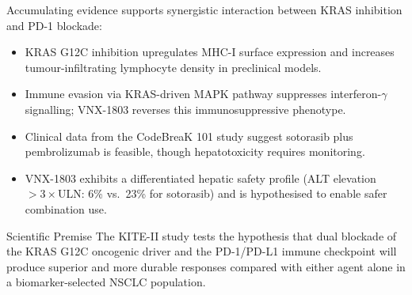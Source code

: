 Accumulating evidence supports synergistic interaction between KRAS inhibition and PD-1 blockade:

\begin{itemize}
  \item KRAS G12C inhibition upregulates MHC-I surface expression and increases tumour-infiltrating lymphocyte density in preclinical models.
  \item Immune evasion via KRAS-driven MAPK pathway suppresses interferon-$\gamma$ signalling; VNX-1803 reverses this immunosuppressive phenotype.
  \item Clinical data from the CodeBreaK 101 study suggest sotorasib plus pembrolizumab is feasible, though hepatotoxicity requires monitoring.
  \item VNX-1803 exhibits a differentiated hepatic safety profile (ALT elevation $>3\times$ULN: 6\% vs.\ 23\% for sotorasib) and is hypothesised to enable safer combination use.
\end{itemize}

\begin{protocolnote}{\faInfoCircle\quad Scientific Premise}
  The KITE-II study tests the hypothesis that dual blockade of the KRAS G12C oncogenic driver and the PD-1/PD-L1 immune checkpoint will produce superior and more durable responses compared with either agent alone in a biomarker-selected NSCLC population.
\end{protocolnote}

